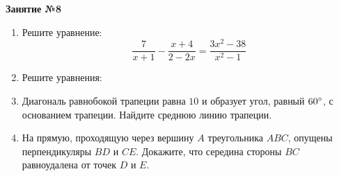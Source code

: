 \documentclass[12pt, a4paper]{article}
\begin{document}
	
   \cfoot{}
\begin{center}
	\Large
	\textbf{Занятие №8}
\end{center}
\begin{enumerate}[label=\textbf{\arabic*.}]
	\item Решите уравнение: $$\dfrac{7}{x+1}-\dfrac{x+4}{2-2x}=\dfrac{3x^2-38}{x^2-1}$$
	\item Решите уравнения:
	\begin{enumerate}[label=\asbuk*)]
	\end{enumerate}
	\item Диагональ равнобокой трапеции равна \( 10 \) и образует угол, равный \( 60\degree \), с основанием трапеции. Найдите среднюю линию трапеции.
	\item На прямую, проходящую через вершину \( A \) треугольника \( ABC \), опущены перпендикуляры \( BD \) и \( CE \). Докажите, что 
	середина стороны \( BC \) равноудалена от точек \( D \) и \( E \).
\end{enumerate}
\end{document}
